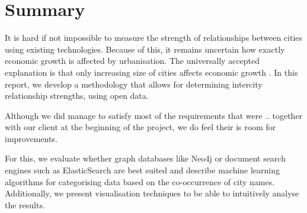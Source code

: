 \newpage

\chapter*{Summary}

It is hard if not impossible to measure the strength of relationships between cities using existing technologies. Because of this, it remains uncertain how exactly economic growth is affected by urbanisation. The universally accepted explanation is that only increasing size of cities affects economic growth \cite{porter2000location}. In this report, we develop a methodology that allows for determining intercity relationship strengths, using open data.



Although we did manage to satisfy most of the requirements that were .. together with our client at the beginning of the project, we do feel their is room for improvements. 













For this, we evaluate whether graph databases like Neo4j \cite{neo4j} or document search engines such as ElasticSearch \cite{elasticsearch} are best suited and describe machine learning algorithms for categorising data based on the co-occurrence of city names. Additionally, we present visualisation techniques to be able to intuitively analyse the results. 